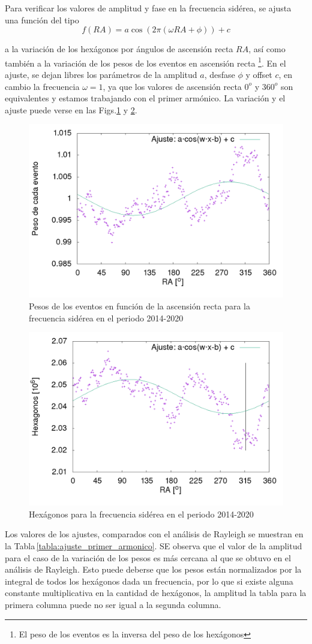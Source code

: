 Para verificar los valores de amplitud y fase en la frecuencia sidérea, se ajusta una función del tipo 
\begin{equation}
	f(RA) = a\cos{(2\pi(\omega RA + \phi))} +c
\end{equation}

a la variación de los hexágonos por ángulos de ascensión recta $RA$, así como también a la variación de los pesos de los eventos en ascensión recta \footnote{El peso de los eventos es la inversa del peso de los hexágonos}. En el ajuste, se dejan libres los parámetros de la amplitud $a$, desfase $\phi$ y offset $c$, en cambio la frecuencia $\omega=1$, ya que los valores de ascensión recta $0^o$ y $360^o$ son equivalentes y estamos trabajando con el primer armónico. La variación y el ajuste puede verse en las Figs.\ref{fig:pesos_ajuste} y \ref{fig:pesos_hexagonos}.

\begin{figure}[H]
	\centering
	\includegraphics[width=0.5\linewidth]{ajuste_pesos.png}
	\caption{Pesos de los eventos en función de la ascensión recta para la frecuencia sidérea en el periodo 2014-2020}
	\label{fig:pesos_ajuste}
\end{figure}


\begin{figure}[H]
	\centering
	\includegraphics[width=0.5\linewidth]{ajuste_hexagonos.png}
	\caption{Hexágonos para la frecuencia sidérea en el periodo 2014-2020}
	\label{fig:pesos_hexagonos}
\end{figure}


Los valores de los ajustes, comparados con el análisis de Rayleigh se muestran en la Tabla\,\ref{tabla:ajuste_primer_armonico}. SE observa que el valor de la amplitud para el caso de la variación de los pesos es más cercana al que se obtuvo en el análisis de Rayleigh. Esto puede deberse que los pesos están normalizados por la integral de todos los hexágonos dada un frecuencia, por lo que si existe alguna constante multiplicativa en la cantidad de hexágonos, la amplitud la tabla para la primera columna puede no ser igual a la segunda columna.

